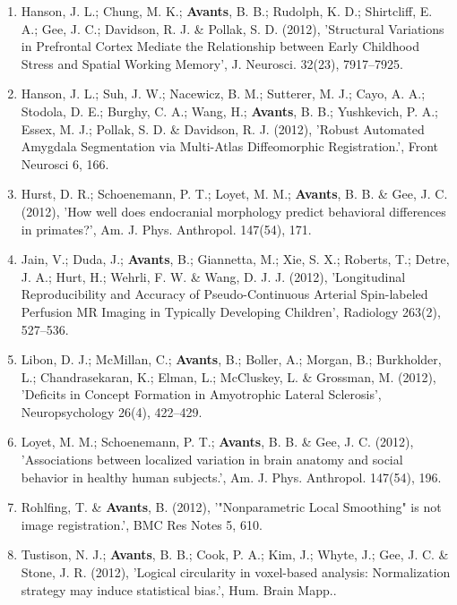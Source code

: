 \documentclass[11pt]{moderncv} %
\begin{document}
\begin{enumerate}
\item  Hanson, J. L.; Chung, M. K.; \textbf{Avants}, B. B.; Rudolph, K. D.; Shirtcliff, E. A.; Gee, J. C.; Davidson, R. J. \&  Pollak, S. D. (2012), 'Structural Variations in Prefrontal Cortex Mediate the Relationship between Early Childhood Stress and Spatial Working Memory', J. Neurosci. 32(23), 7917--7925.

\item  Hanson, J. L.; Suh, J. W.; Nacewicz, B. M.; Sutterer, M. J.; Cayo, A. A.; Stodola, D. E.; Burghy, C. A.; Wang, H.; \textbf{Avants}, B. B.; Yushkevich, P. A.; Essex, M. J.; Pollak, S. D. \&  Davidson, R. J. (2012), 'Robust Automated Amygdala Segmentation via Multi-Atlas Diffeomorphic Registration.', Front Neurosci 6, 166.

\item  Hurst, D. R.; Schoenemann, P. T.; Loyet, M. M.; \textbf{Avants}, B. B. \&  Gee, J. C. (2012), 'How well does endocranial morphology predict behavioral differences in primates?', Am. J. Phys. Anthropol. 147(54), 171.

\item  Jain, V.; Duda, J.; \textbf{Avants}, B.; Giannetta, M.; Xie, S. X.; Roberts, T.; Detre, J. A.; Hurt, H.; Wehrli, F. W. \&  Wang, D. J. J. (2012), 'Longitudinal Reproducibility and Accuracy of Pseudo-Continuous Arterial Spin-labeled Perfusion MR Imaging in Typically Developing Children', Radiology 263(2), 527--536.

\item  Libon, D. J.; McMillan, C.; \textbf{Avants}, B.; Boller, A.; Morgan, B.; Burkholder, L.; Chandrasekaran, K.; Elman, L.; McCluskey, L. \&  Grossman, M. (2012), 'Deficits in Concept Formation in Amyotrophic Lateral Sclerosis', Neuropsychology 26(4), 422--429.

\item  Loyet, M. M.; Schoenemann, P. T.; \textbf{Avants}, B. B. \&  Gee, J. C. (2012), 'Associations between localized variation in brain anatomy and social behavior in healthy human subjects.', Am. J. Phys. Anthropol. 147(54), 196.

\item  Rohlfing, T. \&  \textbf{Avants}, B. (2012), '"Nonparametric Local Smoothing" is not image registration.', BMC Res Notes 5, 610.

\item  Tustison, N. J.; \textbf{Avants}, B. B.; Cook, P. A.; Kim, J.; Whyte, J.; Gee, J. C. \&  Stone, J. R. (2012), 'Logical circularity in voxel-based analysis: Normalization strategy may induce statistical bias.', Hum. Brain Mapp..


\end{enumerate}
\end{document}
